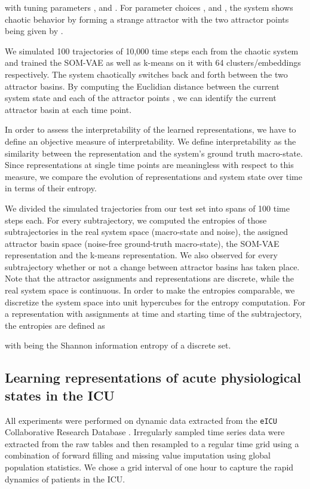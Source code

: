 \documentclass{article}
\begin{document}
with tuning parameters ,  and . For parameter choices ,  and , the system shows chaotic behavior by forming a strange attractor \citep{Tucker1999} with the two attractor points being given by .

We simulated 100 trajectories of 10,000 time steps each from the chaotic system and trained the SOM-VAE as well as k-means on it with 64 clusters/embeddings respectively.
The system chaotically switches back and forth between the two attractor basins.
By computing the Euclidian distance between the current system state and each of the attractor points , we can identify the current attractor basin at each time point.

In order to assess the interpretability of the learned representations, we have to define an objective measure of interpretability.
We define interpretability as the similarity between the representation and the system's ground truth macro-state.
Since representations at single time points are meaningless with respect to this measure, we compare the evolution of representations and system state over time in terms of their entropy.

We divided the simulated trajectories from our test set into spans of 100 time steps each.
For every subtrajectory, we computed the entropies of those subtrajectories in the real system space (macro-state and noise), the assigned attractor basin space (noise-free ground-truth macro-state), the SOM-VAE representation and the k-means representation.
We also observed for every subtrajectory whether or not a change between attractor basins has taken place.
Note that the attractor assignments and representations are discrete, while the real system space is continuous.
In order to make the entropies comparable, we discretize the system space into unit hypercubes for the entropy computation.
For a representation  with assignments  at time  and starting time  of the subtrajectory, the entropies are defined as

with  being the Shannon information entropy of a discrete set.


\subsection{Learning representations of acute physiological states in the ICU}\label{sec:ICU_appendix}

All experiments were performed on dynamic data extracted from the \texttt{eICU} Collaborative Research Database \citep{Goldberger2000}.
Irregularly sampled time series data were extracted from the raw tables and then resampled to a regular time grid using a combination of forward filling and missing value imputation using global population statistics.
We chose a grid interval of one hour to capture the rapid dynamics of patients in the ICU.
\end{document}
